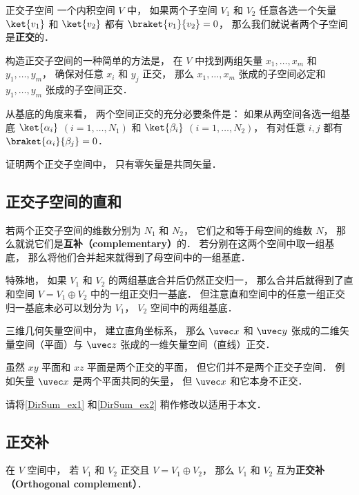 

\begin{definition}{正交子空间}
一个内积空间 $V$ 中， 如果两个子空间 $V_1$ 和 $V_2$ 任意各选一个矢量 $\ket{v_1}$ 和 $\ket{v_2}$ 都有 $\braket{v_1}{v_2} = 0$， 那么我们就说者两个子空间是\textbf{正交}的．
\end{definition}

构造正交子空间的一种简单的方法是， 在 $V$ 中找到两组矢量 $x_1, \dots, x_m$ 和 $y_1, \dots, y_m$， 确保对任意 $x_i$ 和 $y_j$ 正交， 那么 $x_1, \dots, x_m$ 张成的子空间必定和 $y_1, \dots, y_m$ 张成的子空间正交．%

\begin{theorem}{}
从基底的角度来看， 两个空间正交的充分必要条件是： 如果从两空间各选一组基底 $\ket{\alpha_i}$ $(i = 1, \dots, N_1)$ 和 $\ket{\beta_i}$ $(i = 1, \dots, N_2)$， 有对任意 $i, j$ 都有 $\braket{\alpha_i}{\beta_j} = 0$．
\end{theorem}

\begin{exercise}{}
证明两个正交子空间中， 只有零矢量是共同矢量．
\end{exercise}

\subsection{正交子空间的直和}

若两个正交子空间的维数分别为 $N_1$ 和 $N_2$， 它们之和等于母空间的维数 $N$， 那么就说它们是\textbf{互补（complementary）}的． 若分别在这两个空间中取一组基底， 那么将他们合并起来就得到了母空间中的一组基底．

特殊地， 如果 $V_1$ 和 $V_2$ 的两组基底合并后仍然正交归一， 那么合并后就得到了直和空间 $V = V_1 \oplus V_2$ 中的一组正交归一基底． 但注意直和空间中的任意一组正交归一基底未必可以划分为 $V_1$， $V_2$ 空间中的两组基底．

\begin{example}{}
三维几何矢量空间中， 建立直角坐标系， 那么 $\uvec x$ 和 $\uvec y$ 张成的二维矢量空间（平面）与 $\uvec z$ 张成的一维矢量空间（直线）正交．
\end{example}

\begin{example}{}
虽然 $xy$ 平面和 $xz$ 平面是两个正交的平面， 但它们并不是两个正交子空间． 例如矢量 $\uvec x$ 是两个平面共同的矢量， 但 $\uvec x$ 和它本身不正交．
\end{example}

\begin{exercise}{}
请将\autoref{DirSum_ex1} 和\autoref{DirSum_ex2} 稍作修改以适用于本文．
\end{exercise}

\subsection{正交补}
在 $V$ 空间中， 若 $V_1$ 和 $V_2$ 正交且 $V = V_1 \oplus V_2$， 那么 $V_1$ 和 $V_2$ 互为\textbf{正交补（Orthogonal complement）}．
